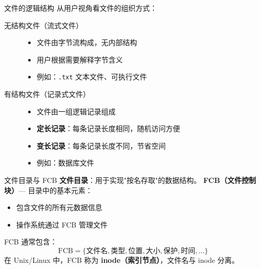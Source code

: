 \documentclass[10pt, aspectratio=169]{beamer}
\begin{document}
\begin{frame}{文件的逻辑结构}
    从用户视角看文件的组织方式：
    \vspace{0.5em}
    \begin{description}
        \item[无结构文件（流式文件）]
            \begin{itemize}
                \item 文件由字节流构成，无内部结构
                \item 用户根据需要解释字节含义
                \item 例如：\texttt{.txt} 文本文件、可执行文件
            \end{itemize}
        \item[有结构文件（记录式文件）]
            \begin{itemize}
                \item 文件由一组逻辑记录组成
                \item \textbf{定长记录}：每条记录长度相同，随机访问方便
                \item \textbf{变长记录}：每条记录长度不同，节省空间
                \item 例如：数据库文件
            \end{itemize}
    \end{description}
\end{frame}

\begin{frame}{文件目录与 FCB}
    \textbf{文件目录}：用于实现"按名存取"的数据结构。
    \vspace{0.5em}
    \textbf{FCB（文件控制块）}--- 目录中的基本元素：
    \begin{itemize}
        \item 包含文件的所有元数据信息
        \item 操作系统通过 FCB 管理文件
    \end{itemize}
    \vspace{0.5em}
    FCB 通常包含：
    \[
    \text{FCB} = \{ \text{文件名}, \text{类型}, \text{位置}, \text{大小}, \text{保护}, \text{时间}, \dots \}
    \]
    \vspace{0.5em}
    在 Unix/Linux 中，FCB 称为 \textbf{inode（索引节点）}，文件名与 inode 分离。
\end{frame}
\end{document}
